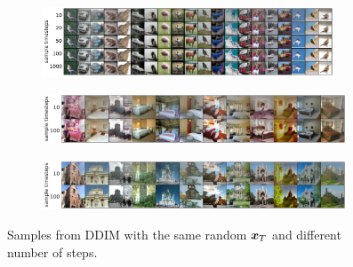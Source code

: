 \begin{figure}
\begin{subfigure}{\textwidth}
    \centering
    \includegraphics[width=0.95\textwidth]{figures/cifar10-consistency.pdf}
\end{subfigure}

\begin{subfigure}{\textwidth}
    \centering
    \includegraphics[width=0.99\textwidth]{figures/bedroom-consistency.pdf}
\end{subfigure}

\begin{subfigure}{\textwidth}
    \centering
    \includegraphics[width=0.99\textwidth]{figures/church-consistency.pdf}
\end{subfigure}
\caption{Samples from DDIM with the same random ${\bm{x}}_T$ and different number of steps.}
\label{fig:consistency}
\end{figure}

